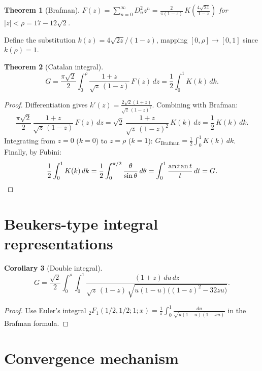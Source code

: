 \documentclass[11pt]{article}
\newtheorem{theorem}{Theorem}
\newtheorem{corollary}[theorem]{Corollary}
\begin{document}
\begin{theorem}[Brafman]\label{thm:brafman}
$F(z) = \sum_{n=0}^{\infty} D_n^2 z^n
= \frac{2}{\pi(1-z)}\,K\!\left(\frac{4\sqrt{2z}}{1-z}\right)$
for $|z| < \rho = 17 - 12\sqrt{2}$.
\end{theorem}

Define the substitution $k(z) = 4\sqrt{2z}/(1-z)$, mapping
$[0, \rho] \to [0, 1]$ since $k(\rho) = 1$.

\begin{theorem}[Catalan integral]\label{thm:catalan}
\begin{equation}\label{eq:catalan}
G = \frac{\pi\sqrt{2}}{2}
\int_0^{\rho} \frac{1+z}{\sqrt{z}\,(1-z)}\,F(z)\,dz
= \frac{1}{2}\int_0^1 K(k)\,dk.
\end{equation}
\end{theorem}

\begin{proof}
Differentiation gives
$k'(z) = \frac{2\sqrt{2}(1+z)}{\sqrt{z}\,(1-z)^2}$.
Combining with Brafman:
\[
\frac{\pi\sqrt{2}}{2}\,\frac{1+z}{\sqrt{z}\,(1-z)}\,F(z)\,dz
= \sqrt{2}\,\frac{1+z}{\sqrt{z}\,(1-z)^2}\,K(k)\,dz
= \frac{1}{2}\,K(k)\,dk.
\]
Integrating from $z=0$ ($k=0$) to $z=\rho$ ($k=1$):
$G_{\mathrm{Brafman}} = \frac{1}{2}\int_0^1 K(k)\,dk$.
Finally, by Fubini:
\[
\frac{1}{2}\int_0^1 K(k)\,dk
= \frac{1}{2}\int_0^{\pi/2} \frac{\theta}{\sin\theta}\,d\theta
= \int_0^1 \frac{\arctan t}{t}\,dt = G. \qedhere
\]
\end{proof}

\section{Beukers-type integral representations}

\begin{corollary}[Double integral]
\begin{equation}\label{eq:beukers}
G = \frac{\sqrt{2}}{2}\int_0^{\rho}\!\int_0^1
\frac{(1+z)\,du\,dz}
{\sqrt{z}\,(1-z)\,\sqrt{u(1-u)\bigl((1-z)^2 - 32zu\bigr)}}.
\end{equation}
\end{corollary}

\begin{proof}
Use Euler's integral
${}_2F_1(1/2,1/2;1;x) = \frac{1}{\pi}\int_0^1
\frac{du}{\sqrt{u(1-u)(1-xu)}}$
in the Brafman formula.
\end{proof}

\section{Convergence mechanism}
\end{document}
